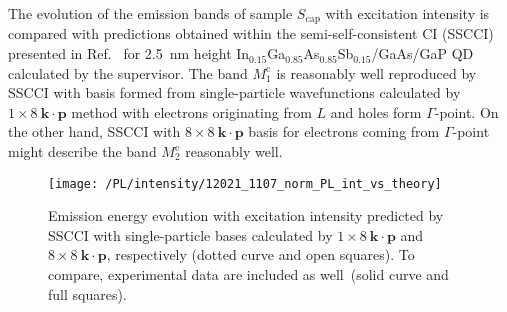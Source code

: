 		
		
%		
		


The evolution of the emission bands of sample $S_\mathrm{cap}$ with excitation intensity is compared with predictions obtained within the semi-self-consistent CI (SSCCI) presented in Ref.~\citep{Klenovsky2017} %
for 2.5~nm height In$_{0.15}$Ga$_{0.85}$As$_{0.85}$Sb$_{0.15}$/GaAs/GaP QD calculated by the supervisor. The band $M_1^\mathrm{c}$ is reasonably well reproduced by SSCCI with basis formed from single-particle wavefunctions calculated by $1\times8~\mathbf{k \cdot p}$ method with electrons originating from $L$ and holes form $\Gamma$-point. On the other hand, SSCCI with $8\times8~\mathbf{k \cdot p}$ basis for electrons coming from $\Gamma$-point might describe the band $M_2^\mathrm{c}$ reasonably well.
%
\begin{figure}
	\centering
	\texttt{[image: /PL/intensity/12021\_1107\_norm\_PL\_int\_vs\_theory]}
	\caption{Emission energy evolution with excitation intensity predicted by SSCCI with single-particle bases calculated by $1\times8~\mathbf{k \cdot p}$ and $8\times8~\mathbf{k \cdot p}$, respectively (dotted curve and open squares). To compare, experimental data are included as well~(solid curve and full squares).}
	\label{fig:QD_cap_int_expvstheory}
\end{figure}

